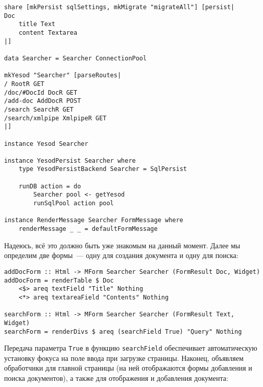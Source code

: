 \begin{lstlisting}
share [mkPersist sqlSettings, mkMigrate "migrateAll"] [persist|
Doc
    title Text
    content Textarea
|]

data Searcher = Searcher ConnectionPool

mkYesod "Searcher" [parseRoutes|
/ RootR GET
/doc/#DocId DocR GET
/add-doc AddDocR POST
/search SearchR GET
/search/xmlpipe XmlpipeR GET
|]

instance Yesod Searcher

instance YesodPersist Searcher where
    type YesodPersistBackend Searcher = SqlPersist

    runDB action = do
        Searcher pool <- getYesod
        runSqlPool action pool

instance RenderMessage Searcher FormMessage where
    renderMessage _ _ = defaultFormMessage
\end{lstlisting}

Надеюсь, всё это должно быть уже знакомым на данный момент. Далее мы определим две формы~--- одну для создания документа и одну для поиска:

\begin{lstlisting}
addDocForm :: Html -> MForm Searcher Searcher (FormResult Doc, Widget)
addDocForm = renderTable $ Doc
    <$> areq textField "Title" Nothing
    <*> areq textareaField "Contents" Nothing

searchForm :: Html -> MForm Searcher Searcher (FormResult Text, Widget)
searchForm = renderDivs $ areq (searchField True) "Query" Nothing
\end{lstlisting}%

Передача параметра \lstinline'True' в функцию \lstinline'searchField' обеспечивает автоматическую установку фокуса на поле ввода при загрузке страницы. Наконец, объявляем обработчики для главной страницы (на ней отображаются формы добавления и поиска документов), а также для отображения и добавления документа:

